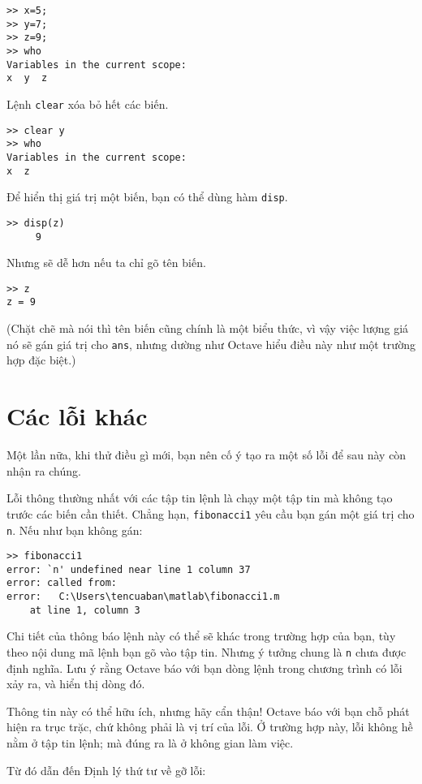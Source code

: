 \documentclass[12pt]{book}
\begin{document}
\begin{verbatim}
>> x=5;
>> y=7;
>> z=9;
>> who
Variables in the current scope:
x  y  z  
\end{verbatim}
%
Lệnh {\tt clear} xóa bỏ hết các biến.

\begin{verbatim}
>> clear y
>> who
Variables in the current scope:
x  z  
\end{verbatim}
%
Để hiển thị giá trị một biến, bạn có thể dùng hàm {\tt disp}.

\begin{verbatim}
>> disp(z)
     9
\end{verbatim}
%
Nhưng sẽ dễ hơn nếu ta chỉ gõ tên biến.

\begin{verbatim}
>> z
z = 9
\end{verbatim}
%
(Chặt chẽ mà nói thì tên biến cũng chính là một biểu thức, vì vậy
việc lượng giá nó sẽ gán giá trị cho {\tt ans}, nhưng dường như 
Octave hiểu điều này như một trường hợp đặc biệt.)


\section{Các lỗi khác}

Một lần nữa, khi thử điều gì mới, bạn nên cố ý tạo ra một số lỗi để
sau này còn nhận ra chúng.

Lỗi thông thường nhất với các tập tin lệnh là chạy một tập tin mà
không tạo trước các biến cần thiết. Chẳng hạn, {\tt fibonacci1} yêu cầu
bạn gán một giá trị cho {\tt n}. Nếu như bạn không gán:

\begin{verbatim}
>> fibonacci1
error: `n' undefined near line 1 column 37
error: called from:
error:   C:\Users\tencuaban\matlab\fibonacci1.m 
	at line 1, column 3
\end{verbatim}
%
Chi tiết của thông báo lệnh này có thể sẽ khác trong trường hợp của
bạn, tùy theo nội dung mã lệnh bạn gõ vào tập tin. Nhưng ý tưởng chung
là {\tt n} chưa được định nghĩa. Lưu ý rằng Octave báo với bạn dòng
lệnh trong chương trình có lỗi xảy ra, và hiển thị dòng đó.

Thông tin này có thể hữu ích, nhưng hãy cẩn thận! Octave báo với
bạn chỗ phát hiện ra trục trặc, chứ không phải là vị trí của lỗi. Ở
trường hợp này, lỗi không hề nằm ở tập tin lệnh; mà đúng ra là ở
không gian làm việc.

Từ đó dẫn đến Định lý thứ tư về gỡ lỗi:
\end{document}
